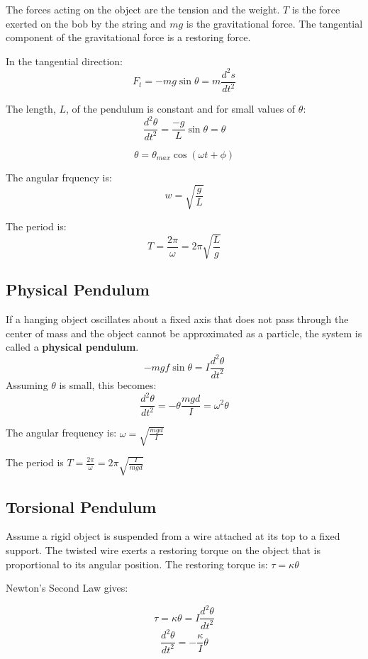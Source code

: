 The forces acting on the object are the tension and the weight. $T$ is the force exerted on the bob by the string and $mg$ is the gravitational force. The tangential component of the gravitational force is a restoring force.

\begin{center}
	In the tangential direction: 
	\[F_t=-mg\sin\theta=m\frac{d^2s}{dt^2}\]
	
	The length, $L$, of the pendulum is constant and for small values of $\theta$:
	\[\frac{d^2\theta}{dt^2}=\frac{-g}{L}\sin\theta=\theta\]
	
	\[\theta=\theta_{max}\cos(\omega t+\phi)\]
	
	The angular frquency is:
	\[w=\sqrt{\frac{g}{L}}\]
	
	The period is:
	\[T=\frac{2\pi}{\omega}=2\pi \sqrt{\frac{L}{g}}\]
\end{center}

\subsection{Physical Pendulum}
If a hanging object oscillates about a fixed axis that does not pass through the center of mass and the object cannot be approximated as a particle, the system is called a \textbf{physical pendulum}.
\[-mgf\sin\theta=I\frac{d^2\theta}{dt^2}\]
Assuming $\theta$ is small, this becomes:
\[\frac{d^2\theta}{dt^2}=-\theta\frac{mgd}{I}=\omega^2\theta\]

The angular frequency is: $\omega=\sqrt{\frac{mgd}{I}}$

The period is $T=\frac{2\pi}{\omega}=2\pi\sqrt{\frac{I}{mgd}}$

\subsection{Torsional Pendulum}
Assume a rigid object is suspended from a wire attached at its top to a fixed support. The twisted wire exerts a restoring torque on the object that is proportional to its angular position.
The restoring torque is: $\tau=\kappa\theta$

\begin{center}
	Newton's Second Law gives:
\end{center}
\[\tau=\kappa\theta=I\frac{d^2\theta}{dt^2}\]
\[\frac{d^2\theta}{dt^2}=-\frac{\kappa}{I}\theta\]


